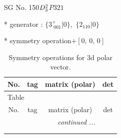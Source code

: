 \documentclass[fleqn,8pt]{jsarticle}
\begin{document}
\setcounter{MaxMatrixCols}{32}

\renewcommand{\tablename}{Table~}
\renewcommand{\figurename}{Figure~}
\begin{center}
\LARGE
SG No. 150\quad$D_{\rm 3}^{2}$\quad$P321$\quad[ trigonal ]
\end{center}

* generator : $\{3^{+}_{\,\,001}|0\},\,\,\{2{}_{110}|0\}$

* symmetry operation\quad$+\left[ 0,\, 0,\, 0 \right]$
\renewcommand{\arraystretch}{1.3}
\begin{longtable}{cccc}
\caption{Symmetry operations for 3d polar vector.}
 \\
 \hline \hline
No. & tag & matrix (polar) & det \\ \hline \endfirsthead

\multicolumn{3}{l}{\tablename\ \thetable{}} \\
 \hline \hline
No. & tag & matrix (polar) & det \\ \hline \endhead

 \hline \hline
\multicolumn{3}{r}{\footnotesize\it continued ...} \\ \endfoot

 \hline \hline
\multicolumn{3}{r}{} \\ \endlastfoot


\end{longtable}
\end{document}

